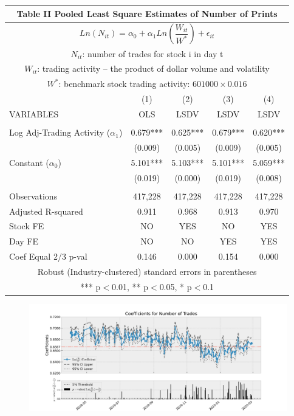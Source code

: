 \documentclass[12pt,a4paper]{article}
\begin{document}
\begin{table}
\begin{tabular}{lcccc}
\multicolumn{5}{c}{Table II Pooled Least Square Estimates of Number of Prints} \\ \hline
\multicolumn{5}{c}{$Ln(N_{it}) = \alpha_{0} + \alpha_{1}Ln(\dfrac{W_{it}}{W^{*}}) + \epsilon_{it}$} \\
\multicolumn{5}{c}{$N_{it}$: number of trades for stock i in day t} \\
\multicolumn{5}{c}{$W_{it}$: trading activity -- the product of dollar volume and volatility} \\
\multicolumn{5}{c}{$W^{*}$: benchmark stock trading activity: $601000\times 0.016$} \\
 & (1) & (2) & (3) & (4) \\
VARIABLES & OLS & LSDV & LSDV & LSDV \\ \hline
 &  &  &  &  \\
Log Adj-Trading Activity ($\alpha_{1}$) & 0.679*** & 0.625*** & 0.679*** & 0.620*** \\
 & (0.009) & (0.005) & (0.009) & (0.005) \\
Constant ($\alpha_{0}$) & 5.101*** & 5.103*** & 5.101*** & 5.059*** \\
 & (0.019) & (0.000) & (0.019) & (0.008) \\
 &  &  &  &  \\
Observations & 417,228 & 417,228 & 417,228 & 417,228 \\
Adjusted R-squared & 0.911 & 0.968 & 0.913 & 0.970 \\
Stock FE & NO & YES & NO & YES \\
Day FE & NO & NO & YES & YES \\
 Coef Equal 2/3 p-val & 0.146 & 0.000 & 0.154 & 0.000 \\ \hline
\multicolumn{5}{c}{ Robust (Industry-clustered) standard errors in parentheses} \\
\multicolumn{5}{c}{ *** p$<$0.01, ** p$<$0.05, * p$<$0.1} \\
\end{tabular}
\end{table}

\begin{landscape}
\begin{figure}
\includegraphics[scale=0.8]{../../times_series_reg_coefficients/res_num_print.jpg} 
\end{figure}
\end{landscape}
\newpage
\end{document}

